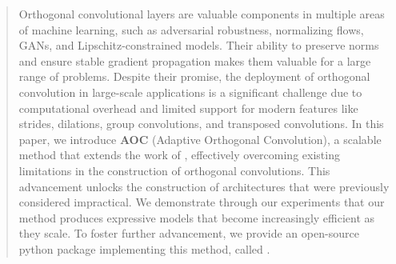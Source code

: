 \documentclass{article}
\begin{document}
\begin{abstract}
Orthogonal convolutional layers are valuable components in multiple areas of machine learning, such as adversarial robustness, normalizing flows, GANs, and Lipschitz-constrained models. Their ability to preserve norms and ensure stable gradient propagation makes them valuable for a large range of problems. Despite their promise, the deployment of orthogonal convolution in large-scale applications is a significant challenge due to computational overhead and limited support for modern features like strides, dilations, group convolutions, and transposed convolutions.
In this paper, we introduce \textbf{AOC} (Adaptive Orthogonal Convolution), a scalable method that extends the work of \cite{li_preventing_2019}, effectively overcoming existing limitations in the construction of orthogonal convolutions. This advancement unlocks the construction of architectures that were previously considered impractical. We demonstrate through our experiments that our method produces expressive models that become increasingly efficient as they scale.
To foster further advancement, we provide an open-source python package implementing this method, called \fulllibname.%


\end{abstract}
\end{document}

